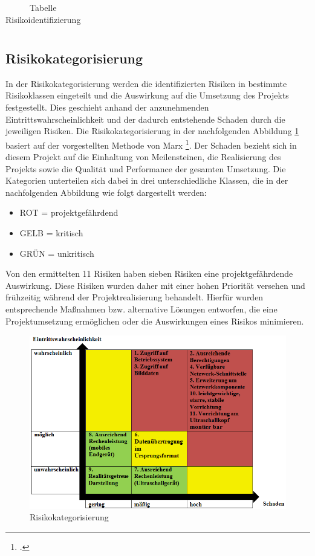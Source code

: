 \begin{center}
\begin{table} [H]
\begin{tabular}{ | p{} | p{} | p{} |}
    \end{tabular}
     \label{tab:Risikoidentifizierung}
     \caption{{\small Tabelle Risikoidentifizierung}}
    \end{table}
\end{center}

\subsection{Risikokategorisierung}
In der Risikokategorisierung werden die identifizierten Risiken in bestimmte Risikoklassen eingeteilt und die Auswirkung auf die Umsetzung des Projekts festgestellt. Dies geschieht anhand der anzunehmenden Eintrittswahrscheinlichkeit und der dadurch entstehende Schaden durch die jeweiligen Risiken. Die Risikokategorisierung in der nachfolgenden Abbildung \ref{fig:risikokategorisierung} basiert auf der vorgestellten Methode von Marx \footcite{Risikomanagement}. Der Schaden bezieht sich in diesem Projekt auf die Einhaltung von Meilensteinen, die Realisierung des Projekts sowie die Qualität und Performance der gesamten Umsetzung. Die Kategorien unterteilen sich dabei in drei unterschiedliche Klassen, die in der nachfolgenden Abbildung wie folgt dargestellt werden:
\begin{itemize}
\item ROT  = projektgefährdend
\item GELB = kritisch
\item GRÜN = unkritisch
\end{itemize}
Von den ermittelten 11 Risiken haben sieben Risiken eine projektgefährdende Auswirkung. Diese Risiken wurden daher mit einer hohen Priorität versehen und frühzeitig während der Projektrealisierung behandelt. Hierfür wurden entsprechende Maßnahmen bzw. alternative Lösungen entworfen, die eine Projektumsetzung ermöglichen oder die Auswirkungen eines Risikos minimieren. 
\begin{figure}[h]
	\centering
	\includegraphics[width=1\textwidth]{Bilder/Risiko_und_Anforderungsanalyse/Risikokategorisierung.png}
	\caption{Risikokategorisierung}
	\label{fig:risikokategorisierung}
\end{figure}

